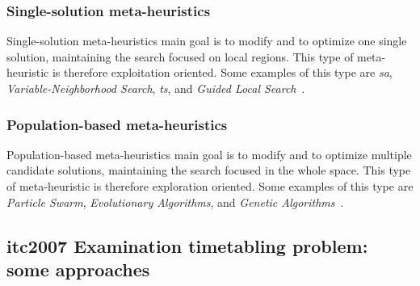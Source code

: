 \subsubsection{Single-solution meta-heuristics}
Single-solution meta-heuristics main goal is to modify and to optimize one single solution, maintaining the search focused on local regions. This type of meta-heuristic is therefore exploitation oriented. Some examples of this type are \textit{\gls{sa}}, \textit{Variable-Neighborhood Search}, \textit{\gls{ts}}, and \textit{Guided Local Search}~\cite{Talbi2009}. \\

\subsubsection{Population-based meta-heuristics}
Population-based meta-heuristics main goal is to modify and to optimize multiple candidate solutions, maintaining the search focused in the whole space. This type of meta-heuristic is therefore exploration oriented. Some examples of this type are \textit{Particle Swarm}, \textit{Evolutionary Algorithms}, and \textit{Genetic Algorithms}~\cite{Talbi2009}.\\


\subsection{\gls{itc2007} Examination timetabling problem: some approaches}
\label{subsection:ApprITC2007}

